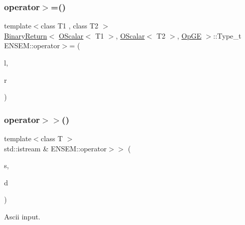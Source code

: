 \mbox{\label{group__obsscalar_ga662fdae406fd639518843fb671368f0d}} 
\subsubsection{\texorpdfstring{operator$>$=()}{operator>=()}}
{\footnotesize\ttfamily template$<$class T1 , class T2 $>$ \\
\mbox{\hyperlink{structENSEM_1_1BinaryReturn}{Binary\+Return}}$<$ \mbox{\hyperlink{classENSEM_1_1OScalar}{O\+Scalar}}$<$ T1 $>$, \mbox{\hyperlink{classENSEM_1_1OScalar}{O\+Scalar}}$<$ T2 $>$, \mbox{\hyperlink{structENSEM_1_1OpGE}{Op\+GE}} $>$\+::Type\+\_\+t E\+N\+S\+E\+M\+::operator$>$= (\begin{DoxyParamCaption}\item[{const \mbox{\hyperlink{classENSEM_1_1OScalar}{O\+Scalar}}$<$ T1 $>$ \&}]{l,  }\item[{const \mbox{\hyperlink{classENSEM_1_1OScalar}{O\+Scalar}}$<$ T2 $>$ \&}]{r }\end{DoxyParamCaption})\hspace{0.3cm}{\ttfamily [inline]}}

\mbox{\label{group__obsscalar_ga8ceaf63a1afb58830666610d78d86809}} 
\subsubsection{\texorpdfstring{operator$>$$>$()}{operator>>()}\hspace{0.1cm}{\footnotesize\ttfamily [1/3]}}
{\footnotesize\ttfamily template$<$class T $>$ \\
std\+::istream \& E\+N\+S\+E\+M\+::operator$>$$>$ (\begin{DoxyParamCaption}\item[{std\+::istream \&}]{s,  }\item[{\mbox{\hyperlink{classENSEM_1_1OScalar}{O\+Scalar}}$<$ T $>$ \&}]{d }\end{DoxyParamCaption})\hspace{0.3cm}{\ttfamily [inline]}}



Ascii input. 

